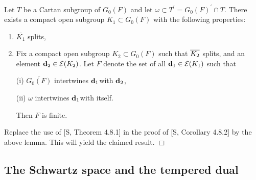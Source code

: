\begin{lemma}
Let $T$ be a Cartan subgroup of $G_0(F)$ and let $\omega \subset T^{\prime
}=G_0(F)^{\prime }\cap T$. There exists a compact open subgroup $K_1\subset
G_0(F)$ with the following properties:

\begin{enumerate}
\item  $\overline{K_1}$ splits,

\item  Fix a compact open subgroup $K_2\subset G_0(F)$ such that $\overline{%
K_2}$ splits, and an element ${\bf d}_2\in {\cal E}(K_2)$. Let $F$ denote
the set of all ${\bf d}_1\in {\cal E}(K_1)$ such that

(i) $\overline{G_0(F)}$ intertwines ${\bf d}_1$with ${\bf d}_2$,

(ii) $\omega $ intertwines ${\bf d}_1$with itself.

Then $F$ is finite.
\end{enumerate}
\end{lemma}

Replace the use of [S, Theorem 4.8.1] in the proof of [S, Corollary 4.8.2]
by the above lemma. This will yield the claimed result. $\Box $

\subsection{The Schwartz space and the tempered dual}

